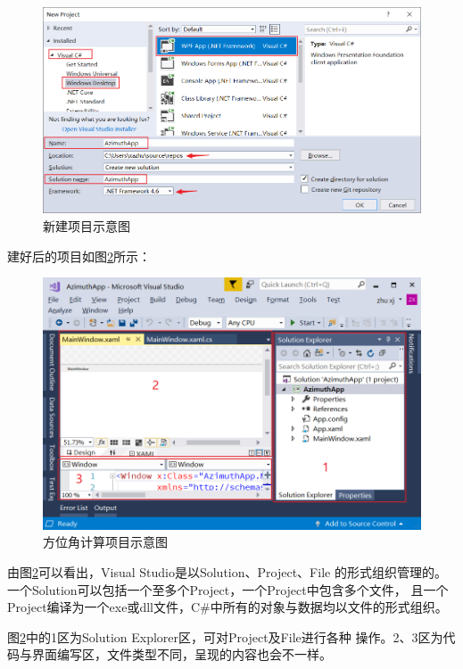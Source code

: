 \begin{figure}[htbp]
	\centering
	\includegraphics[scale=0.6]{surveybase/AzimuthApp1.png}
	\caption{新建项目示意图}
	\label{fig:AzimuthApp1}
\end{figure}

建好后的项目如图\ref{fig:AzimuthApp2}所示：

\begin{figure}[htbp]
	\centering
	\includegraphics[scale=0.6]{surveybase/AzimuthApp2.png}
	\caption{方位角计算项目示意图}
	\label{fig:AzimuthApp2}
\end{figure}

由图\ref{fig:AzimuthApp2}可以看出，Visual Studio是以Solution、Project、File
的形式组织管理的。一个Solution可以包括一个至多个Project，一个Project中包含多个文件，
且一个Project编译为一个exe或dll文件，C\#中所有的对象与数据均以文件的形式组织。

图\ref{fig:AzimuthApp2}中的1区为Solution Explorer区，可对Project及File进行各种
操作。2、3区为代码与界面编写区，文件类型不同，呈现的内容也会不一样。

